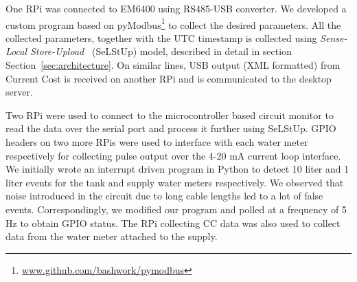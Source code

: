\documentclass[10pt]{sensys-proc}
\newcommand{\secref}[1]{Section~\ref{#1}}
\newcommand{\tabref}[1]{Table~\ref{#1}}
\newcommand{\paradigm}{Sense-Local Store-Upload}
\newcommand{\selstup}{SeLStUp}
\newcommand{\paradigms}{Sense-Local Store-Upload~}
\begin{document}
 One RPi was connected to EM6400 using RS485-USB converter. We developed a custom program based on pyModbus\footnote{\url{www.github.com/bashwork/pymodbus}} to collect the desired parameters. %
All the collected parameters, together with the UTC timestamp is %
collected using \emph{\paradigms} (\selstup) model, described in detail in section \secref{sec:architecture}. On similar lines, USB output (XML formatted) from Current Cost is received on another RPi and is communicated to the desktop server. %


Two RPi were used to connect to the microcontroller based circuit monitor to read the data over the serial port and process it further using \selstup.
GPIO headers on two more RPis were used to interface with each water meter respectively for collecting pulse output over the 4-20 mA current loop interface. We initially wrote an interrupt driven program in Python to detect 10 liter and 1 liter events for the tank and supply water meters respectively. We observed that noise introduced in the circuit due to long cable lengths led to a lot of false events. Correspondingly, we modified our program and polled at a frequency of 5 Hz to obtain GPIO status. The RPi collecting CC data was also used to collect data from the water meter attached to the supply.%
\end{document}

